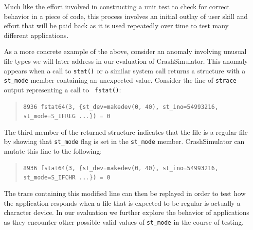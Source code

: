     Much like the effort involved in constructing a unit test to
    check for correct behavior in a piece of code, this
    process involves an initial outlay of user skill and effort that 
    will be paid back as it is used
    repeatedly over time to test many different applications.


    As a more concrete example of the above, consider an anomaly
    involving unusual file types we will later address in our evaluation of
    CrashSimulator.  This anomaly appears when a call to {\tt stat()} or a similar system
    call returns a structure with a {\tt st\_mode} member containing an unexpected
    value. Consider the line of {\tt strace} output representing a call to {\tt
      fstat()}:
    \begin{quote}
      {\tt 8936  fstat64(3, \{st\_dev=makedev(0, 40), st\_ino=54993216, st\_mode=S\_IFREG ...\}) = 0}
    \end{quote}
    The third member of the returned structure indicates that the file is a
    regular file by showing that {\tt st\_mode} flag is set in the {\tt st\_mode}
    member.  CrashSimulator can mutate this  line to the following:

    \begin{quote}
      {\tt 8936  fstat64(3, \{st\_dev=makedev(0, 40), st\_ino=54993216, st\_mode=S\_IFCHR ...\}) = 0}
    \end{quote}
    
    The trace containing this modified line can then be replayed in order to
    test how
    the application responds when a file
    that is expected to be regular is actually a character device. In our
    evaluation we further explore the behavior of applications as they encounter
    other possible valid values of {\tt st\_mode} in the course of testing.


